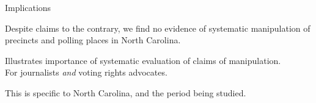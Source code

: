 \documentclass[xcolor=dvipsnames, 11pt, table]{beamer}
\begin{document}
\begin{frame}{Implications }


	\pause \vspace{.25in}
	Despite claims to the contrary, we find no evidence of systematic manipulation of precincts and polling places in North Carolina.


	\pause
	\vspace{0.15in}

	Illustrates importance of \alert{systematic} evaluation of claims of manipulation.\\
	\pause For journalists \emph{and} voting rights advocates.

	\pause
	\vspace{0.15in}

	This is specific to North Carolina, and the period being studied.


\end{frame}


















\end{document}
